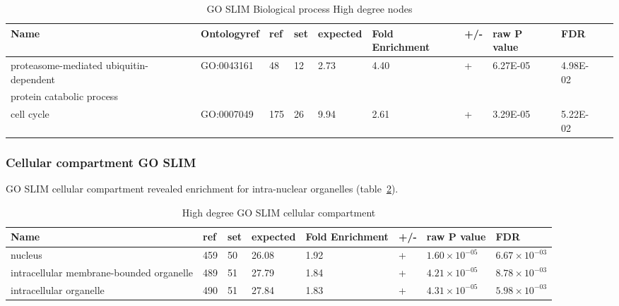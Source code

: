 \begin{table}
\centering
\begin{adjustbox}{max width=\textwidth}
\begin{tabular}{l l l l l l l l l l}
Name & Ontologyref &ref & set&	expected &	Fold Enrichment &	+/-	&raw P value&FDR\\
\hline
proteasome-mediated ubiquitin-dependent &GO:0043161 & 48 & 	12  &	2.73 &	4.40 & 	+ & 	6.27E-05 & 	4.98E-02 \\
protein catabolic process\\
cell cycle& GO:0007049&	175 	&26 &	9.94& 	2.61 &	+ & 	3.29E-05& 5.22E-02\\
\end{tabular}
\end{adjustbox}
\caption{GO SLIM Biological process High degree nodes}
\label{tab: high degree slim biological process}
\end{table}

\subsubsection{Cellular compartment GO SLIM}
GO SLIM cellular compartment revealed enrichment for intra-nuclear organelles (table~\ref{tab: high degree slim cellular compartment}).

\begin{table}
\centering
\begin{adjustbox}{max width=\textwidth}
\begin{tabular}{llllllll}
  Name  &ref &set &	expected &	Fold Enrichment &	+/-	&raw P value&FDR\\
\hline
nucleus &	459& 	50& 	26.08& 	1.92& 	+ &	$1.60\times 10^{-05}$& 	$6.67\times 10^{-03}$\\
intracellular membrane-bounded organelle&	489&	51&	27.79&	1.84&	+&	$4.21\times10^{-05}$ &	$8.78\times 10^{-03}$\\
intracellular organelle&	490&	51&	27.84&	1.83&	+&	$4.31\times 10^{-05}$&	$5.98\times10^{-03}$\\
\end{tabular}
\end{adjustbox}
\caption{High degree GO SLIM cellular compartment}
\label{tab: high degree slim cellular compartment}
\end{table}

